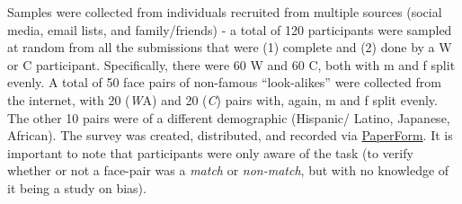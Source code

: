 Samples were collected from individuals recruited from multiple sources (\eg social media, email lists, and family/friends) - a total of 120 participants were sampled at random from all the submissions that were (1) complete and (2) done by a W or C participant. Specifically, there were 60 W and 60 C, both with \gls{m} and \gls{f} split evenly. A total of 50 face pairs of non-famous ``look-alikes'' were collected from the internet, with 20 ({\emph WA}) and 20 ({\emph C}) pairs with, again, \gls{m} and \gls{f} split evenly. The other 10 pairs were of a different demographic (\eg Hispanic/ Latino, Japanese, African). The survey was created, distributed, and recorded via \href{https://paperform.co}{PaperForm}. It is important to note that participants were only aware of the task (\ie to verify whether or not a face-pair was a \emph{match} or \emph{non-match}, but with no knowledge of it being a study on bias).
